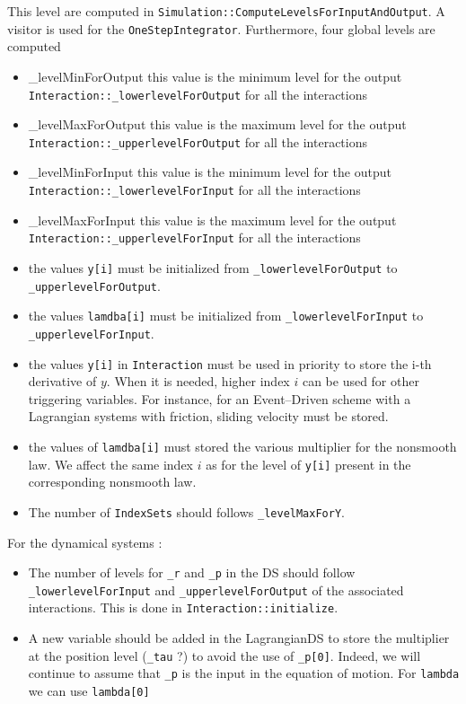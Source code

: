 This level are computed in {\tt Simulation::ComputeLevelsForInputAndOutput}. A visitor is used for the {\tt OneStepIntegrator}. Furthermore, four global levels are computed
\begin{itemize}
\item {\_levelMinForOutput} this value is the minimum level for the output {\tt Interaction::\_lowerlevelForOutput}  for all the interactions
\item {\_levelMaxForOutput} this value is the maximum level for the output {\tt Interaction::\_upperlevelForOutput}  for all the interactions
\item {\_levelMinForInput} this value is the minimum level for the output {\tt Interaction::\_lowerlevelForInput}  for all the interactions
\item {\_levelMaxForInput} this value is the maximum level for the output {\tt Interaction::\_upperlevelForInput}  for all the interactions
\end{itemize}




\begin{itemize}
\item the values {\tt y[i]} must be initialized from {\tt \_lowerlevelForOutput} to {\tt \_upperlevelForOutput}.
\item the values {\tt lamdba[i]} must be initialized from {\tt \_lowerlevelForInput} to  {\tt \_upperlevelForInput}.
\item the values {\tt y[i]} in {\tt Interaction} must be used in priority to store the i-th derivative of $y$. When it is needed, higher index $i$ can be used for other triggering variables. For instance, for an Event--Driven scheme with a Lagrangian systems with friction, sliding velocity must be stored.
\item the values of {\tt lamdba[i]} must stored the various multiplier for the nonsmooth law. We affect the same index $i$ as for the level of {\tt y[i]} present in the corresponding nonsmooth law.
\item The number of {\tt IndexSets} should follows {\tt \_levelMaxForY}.
\end{itemize}



For the dynamical systems :
\begin{itemize}
\item The number of levels for {\tt \_r} and {\tt \_p} in the DS should follow {\tt \_lowerlevelForInput} and {\tt \_upperlevelForOutput} of the associated interactions. This is done in {\tt Interaction::initialize}.
\item A new variable should be added in the LagrangianDS to store the multiplier at the position level ({\tt \_tau} ?) to avoid the use of {\tt \_p[0]}. Indeed, we will continue to assume that {\tt \_p} is the input in the equation of motion. For {\tt lambda} we can  use {\tt lambda[0]}
\end{itemize}

